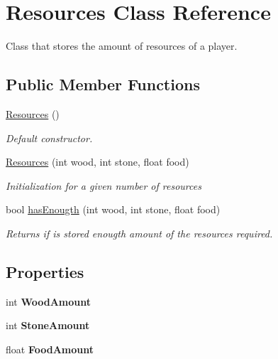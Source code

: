 \hypertarget{class_resources}{}\section{Resources Class Reference}
\label{class_resources}


Class that stores the amount of resources of a player.  


\subsection*{Public Member Functions}
\begin{DoxyCompactItemize}
\item 
\mbox{\hyperlink{class_resources_a44d30192ea26df342b18e624ba343eb0}{Resources}} ()
\begin{DoxyCompactList}\small\item\em Default constructor. \end{DoxyCompactList}\item 
\mbox{\hyperlink{class_resources_a9def630f13f3769b0298e3a080a93fa8}{Resources}} (int wood, int stone, float food)
\begin{DoxyCompactList}\small\item\em Initialization for a given number of resources \end{DoxyCompactList}\item 
bool \mbox{\hyperlink{class_resources_a903a0bf6e5c8e9839cec1736a8c44917}{has\+Enougth}} (int wood, int stone, float food)
\begin{DoxyCompactList}\small\item\em Returns if is stored enougth amount of the resources required. \end{DoxyCompactList}\end{DoxyCompactItemize}
\subsection*{Properties}
\begin{DoxyCompactItemize}
\item 
\mbox{\label{class_resources_a206ee04da4cc370a577bbc7d0b3fc78a}} 
int {\bfseries Wood\+Amount}
\item 
\mbox{\label{class_resources_affb7720a9a89462b8b15c62a7beb2a75}} 
int {\bfseries Stone\+Amount}
\item 
\mbox{\label{class_resources_a10bfae4f36ce4329a78fa64396220e2b}} 
float {\bfseries Food\+Amount}
\end{DoxyCompactItemize}


